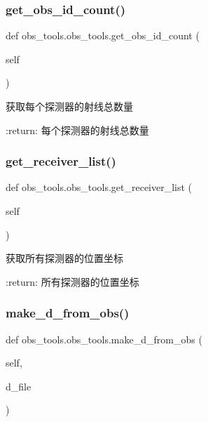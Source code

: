 \subsubsection{\texorpdfstring{get\+\_\+obs\+\_\+id\+\_\+count()}{get\_obs\_id\_count()}}
{\footnotesize\ttfamily def obs\+\_\+tools.\+obs\+\_\+tools.\+get\+\_\+obs\+\_\+id\+\_\+count (\begin{DoxyParamCaption}\item[{}]{self }\end{DoxyParamCaption})}

\begin{DoxyVerb}获取每个探测器的射线总数量

:return: 每个探测器的射线总数量
\end{DoxyVerb}
 \mbox{\label{classobs__tools_1_1obs__tools_af845d7a2d60236a1a119394ae8d2ef71}} 
\subsubsection{\texorpdfstring{get\+\_\+receiver\+\_\+list()}{get\_receiver\_list()}}
{\footnotesize\ttfamily def obs\+\_\+tools.\+obs\+\_\+tools.\+get\+\_\+receiver\+\_\+list (\begin{DoxyParamCaption}\item[{}]{self }\end{DoxyParamCaption})}

\begin{DoxyVerb}获取所有探测器的位置坐标

:return: 所有探测器的位置坐标
\end{DoxyVerb}
 \mbox{\label{classobs__tools_1_1obs__tools_a13206e4d851f64c4358c9f5e73c8e4f6}} 
\subsubsection{\texorpdfstring{make\+\_\+d\+\_\+from\+\_\+obs()}{make\_d\_from\_obs()}}
{\footnotesize\ttfamily def obs\+\_\+tools.\+obs\+\_\+tools.\+make\+\_\+d\+\_\+from\+\_\+obs (\begin{DoxyParamCaption}\item[{}]{self,  }\item[{}]{d\+\_\+file }\end{DoxyParamCaption})}

